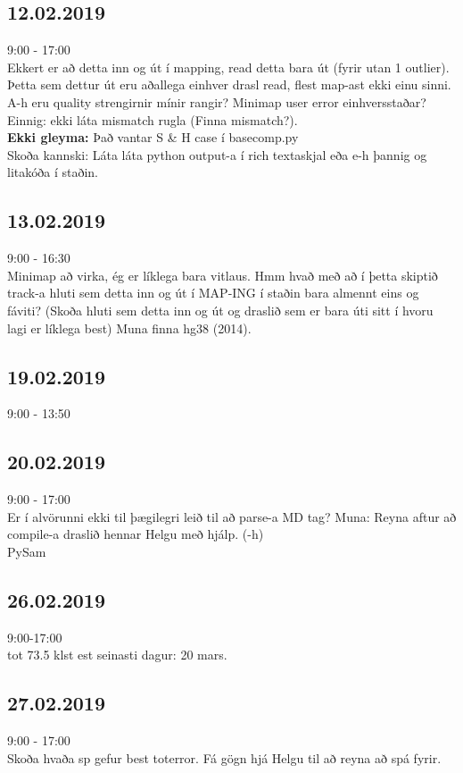 \documentclass{article}
\begin{document}
\subsection*{12.02.2019}
9:00 - 17:00 \\
Ekkert er að detta inn og út í mapping, read detta bara út (fyrir utan 1 outlier). Þetta sem dettur út eru aðallega einhver drasl read, flest map-ast ekki einu sinni. \\
A-h eru quality strengirnir mínir rangir? Minimap user error einhversstaðar? Einnig: ekki láta mismatch rugla (Finna mismatch?).\\
\textbf{Ekki gleyma: } 
Það vantar S \& H case í basecomp.py \\
Skoða kannski: Láta láta python output-a í rich textaskjal eða e-h þannig og litakóða í staðin.\\

\subsection*{13.02.2019}
9:00 - 16:30\\
Minimap að virka, ég er líklega bara vitlaus. 	
Hmm hvað með að í þetta skiptið track-a hluti sem detta inn og út í MAP-ING í staðin bara almennt eins og fáviti? (Skoða hluti sem detta inn og út og draslið sem er bara úti sitt í hvoru lagi er líklega best)
Muna finna hg38 (2014).


\subsection*{19.02.2019}
9:00 - 13:50 \\

\subsection*{20.02.2019}
9:00 - 17:00\\
Er í alvörunni ekki til þægilegri leið til að parse-a MD tag?
Muna: Reyna aftur að compile-a draslið hennar Helgu með hjálp. (-h) \\
PySam


\subsection*{26.02.2019}
9:00-17:00 \\

tot 73.5 klst
est seinasti dagur: 20 mars.
\subsection*{27.02.2019}
9:00 - 17:00 \\
Skoða hvaða sp gefur best toterror. Fá gögn hjá Helgu til að reyna að spá fyrir. 
\end{document}
